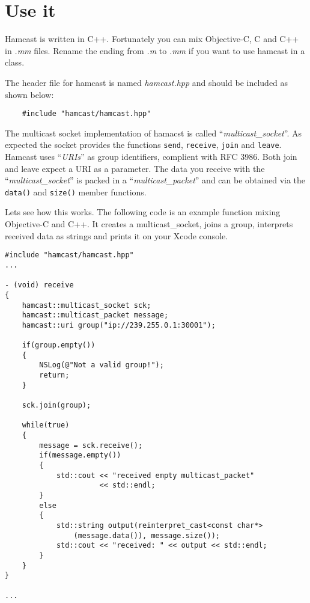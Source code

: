 \section{Use it}
\label{sec:usage}

Hamcast is written in C++. Fortunately you can mix Objective-C, C and C++ in \textit{.mm} files. Rename the ending from \textit{.m} to \textit{.mm} if you want to use hamcast in a class.

The header file for hamcast is named \textit{hamcast.hpp} and should be included as shown below:

\begin{lstlisting}
	#include "hamcast/hamcast.hpp"
\end{lstlisting}

The multicast socket implementation of hamacst is called ``\textit{multicast\_socket}''. As expected the socket provides the functions \lstinline^send^, \lstinline^receive^, \lstinline^join^ and \lstinline^leave^. Hamcast uses ``\textit{URIs}'' as group identifiers, complient with RFC 3986. Both join and leave expect a URI as a parameter. The data you receive with the ``\textit{multicast\_socket}'' is packed in a ``\textit{multicast\_packet}'' and can be obtained via the \lstinline^data()^ and \lstinline^size()^ member functions.

Lets see how this works. The following code is an example function mixing Objective-C and C++. It creates a multicast\_socket, joins a group, interprets received data as strings and prints it on your Xcode console.

\newpage
\begin{lstlisting}
#include "hamcast/hamcast.hpp"
...
	
- (void) receive
{
    hamcast::multicast_socket sck;
	hamcast::multicast_packet message;
    hamcast::uri group("ip://239.255.0.1:30001");
    
    if(group.empty())
    {
        NSLog(@"Not a valid group!");
        return;
    }
    
    sck.join(group);
                       
    while(true)
    {
        message = sck.receive();
        if(message.empty())
        {
            std::cout << "received empty multicast_packet"
            		  << std::endl;
        }
        else
        {
        	std::string output(reinterpret_cast<const char*>
        		(message.data()), message.size());
        	std::cout << "received: " << output << std::endl;
        }
    }
}

...
\end{lstlisting}